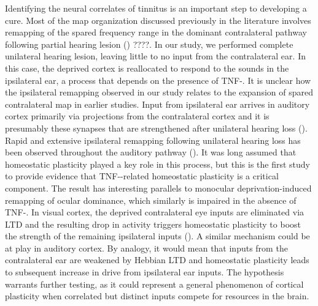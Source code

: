  Identifying the neural correlates of tinnitus is an important step to developing a cure. Most of the map organization discussed previously in the literature involves remapping of the spared frequency range in the dominant contralateral pathway following partial hearing lesion (\cite{}) ????. In our study, we performed complete unilateral hearing lesion, leaving little to no input from the contralateral ear. In this case, the deprived cortex is reallocated to respond to the sounds in the ipsilateral ear, a process that depends on the presence of TNF-\textalpha{}. It is unclear how the ipsilateral remapping observed in our study relates to the expansion of spared contralateral map in earlier studies. Input from ipsilateral ear arrives in auditory cortex primarily via projections from the contralateral cortex and it is presumably these synapses that are strengthened after unilateral hearing loss (\cite{Yorke1975}). Rapid and extensive ipsilateral remapping following unilateral hearing loss has been observed throughout the auditory pathway (\cite{Mossop2000}). It was long assumed that homeostatic plasticity played a key role in this process, but this is the first study to provide evidence that TNF-\textalpha{}-related homeostatic plasticity is a critical component. The result has interesting parallels to monocular deprivation-induced remapping of ocular dominance, which similarly is impaired in the absence of TNF-\textalpha{}. In visual cortex, the deprived contralateral eye inputs are eliminated via LTD and the resulting drop in activity triggers homeostatic plasticity to boost the strength of the remaining ipsilateral inputs (\cite{Kaneko2008}). A similar mechanism could be at play in auditory cortex. By analogy, it would mean that inputs from the contralateral ear are weakened by Hebbian LTD and homeostatic plasticity leads to subsequent increase in drive from ipsilateral ear inputs. The hypothesis warrants further testing, as it could represent a general phenomenon of cortical plasticity when correlated but distinct inputs compete for resources in the brain.

\printbibliography